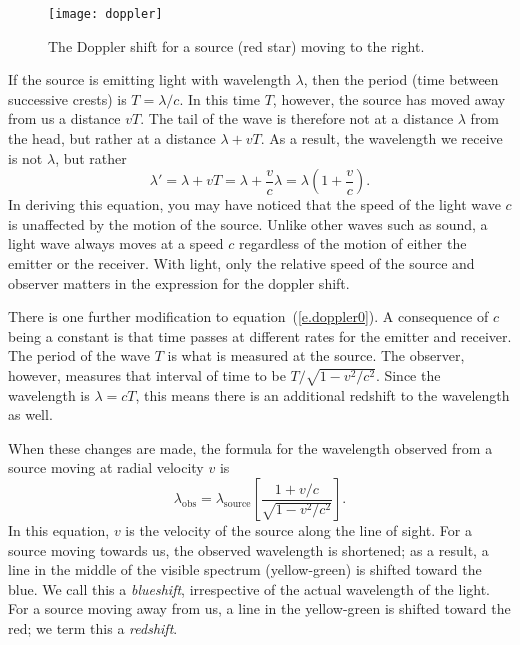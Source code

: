 \begin{figure*}
\centering\texttt{[image: doppler]}
\caption[Schematic of the doppler effect]{The Doppler shift for a source (red star) moving to the right.}
\label{f.doppler}
\end{figure*}

If the source is emitting light with wavelength $\lambda$, then the period (time between successive crests) is $T = \lambda/c$.  In this time $T$, however, the source has moved away from us a distance $vT$. The tail of the wave is therefore not at a distance $\lambda$ from the head, but rather at a distance $\lambda + vT$.  As a result, the wavelength we receive is not $\lambda$, but rather
\begin{equation}\label{e.doppler0}
 \lambda' = \lambda + vT = \lambda + \frac{v}{c}\lambda = \lambda\left(1+\frac{v}{c}\right).
\end{equation}
In deriving this equation, you may have noticed that the speed of the light wave $c$ is unaffected by the motion of the source.  Unlike other waves such as sound, a light wave always moves at a speed $c$ regardless of the motion of either the emitter or the receiver. With light, only the relative speed of the source and observer matters in the expression for the doppler shift.

There is one further modification to equation~(\ref{e.doppler0}).
A consequence of $c$ being a constant is that time passes at different rates for the emitter and receiver.  The period of the wave $T$ is what is measured at the source.  The observer, however, measures that interval of time to be $T/\sqrt{1-v^{2}/c^{2}}$.  Since the wavelength is $\lambda = cT$, this means there is an additional redshift to the wavelength as well.

When these changes are made, the formula for the wavelength observed from a source moving at radial velocity $v$ is
\begin{equation}\label{e.doppler}
\lambda_{\mathrm{obs}} 
 = \lambda_{\mathrm{source}} \left[\frac{1+v/c}{\sqrt{1-v^{2}/c^{2}}}\right].
\end{equation}
In this equation, $v$ is the velocity of the source along the line of sight.
For a source moving towards us, the observed wavelength is shortened; as a result, a line in the middle of the visible spectrum (yellow-green) is shifted toward the blue.  We call this a \emph{blueshift}, irrespective of the actual wavelength of the light.  For a source moving away from us, a line in the yellow-green is shifted toward the red; we term this a \emph{redshift}.

